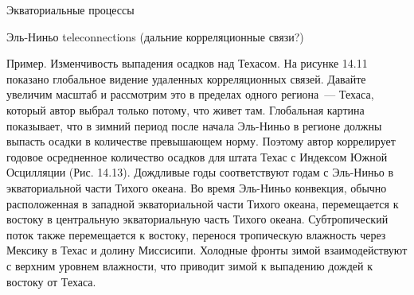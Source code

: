 \begin{chapter}{Экваториальные процессы}
\begin{section}{Эль-Ниньо teleconnections (дальние корреляционные связи?)}
\begin{paragraph}{Пример. Изменчивость выпадения осадков над Техасом.}
На рисунке 14.11 показано глобальное видение удаленных корреляционных
связей. Давайте увеличим масштаб и рассмотрим это в пределах одного
региона~--- Техаса, который автор выбрал только потому, что живет
там. Глобальная картина показывает, что в зимний период после начала
Эль-Ниньо в регионе должны выпасть осадки в количестве превышающем
норму. Поэтому автор коррелирует годовое осредненное количество
осадков для штата Техас с Индексом Южной Осцилляции
(Рис. 14.13). Дождливые годы соответствуют годам с Эль-Ниньо в
экваториальной части Тихого океана. Во время Эль-Ниньо конвекция,
обычно расположенная в западной экваториальной части Тихого океана,
перемещается к востоку в центральную экваториальную часть Тихого
океана. Субтропический поток также перемещается к востоку, перенося
тропическую влажность через Мексику в Техас и долину
Миссисипи. Холодные фронты зимой взаимодействуют с верхним уровнем
влажности, что приводит зимой к выпадению дождей к востоку от Техаса.
%


\end{paragraph}
\end{section}
\end{chapter}
